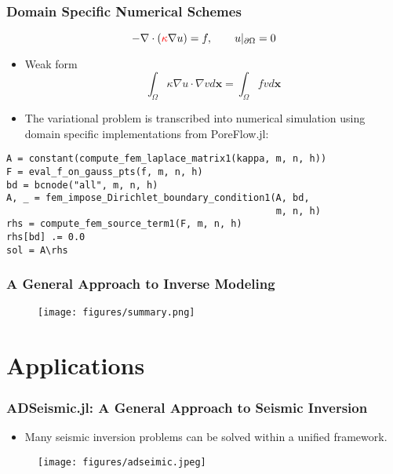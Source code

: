 \documentclass[usenames,dvipsnames]{beamer}
\begin{document}
\begin{frame}[fragile]
	\frametitle{Domain Specific Numerical Schemes}
	
	\begin{equation*}
		-\nabla \cdot (\textcolor{red}{\kappa} \nabla u) = f, \qquad u|_{\partial \Omega} = 0 
	\end{equation*}
	
	\begin{itemize}
		\item Weak form 
		\begin{equation*}
			\int_\Omega \kappa \nabla u \cdot \nabla v d\mathbf{x} = \int_\Omega f v d\mathbf{x}
		\end{equation*}
		\item The variational problem is transcribed into numerical simulation using domain specific implementations from PoreFlow.jl:
	\end{itemize}
	{\small
	\begin{lstlisting}
A = constant(compute_fem_laplace_matrix1(kappa, m, n, h))
F = eval_f_on_gauss_pts(f, m, n, h)
bd = bcnode("all", m, n, h)
A, _ = fem_impose_Dirichlet_boundary_condition1(A, bd, 
                                                m, n, h)
rhs = compute_fem_source_term1(F, m, n, h)
rhs[bd] .= 0.0
sol = A\rhs\end{lstlisting}
}
\end{frame}



\begin{frame}
	\frametitle{A General Approach to Inverse Modeling}
	\begin{figure}[hbt]
  \texttt{[image: figures/summary.png]}
\end{figure}

\end{frame}


\section{Applications}



\begin{frame}
	\frametitle{ADSeismic.jl: A General Approach to Seismic Inversion}
	\begin{itemize}
		\item Many seismic inversion problems can be solved within a unified framework. 
	\end{itemize}
	\begin{figure}[hbt]
  \texttt{[image: figures/adseimic.jpeg]}
\end{figure}
	
\end{frame}
\end{document}
